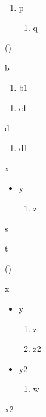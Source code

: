 \documentclass{article}
\begin{document}
\begin{enumerate}\item p \begin{enumerate}\item q\end{enumerate}\end{enumerate}
\begin{list}{()}{}
\item b \begin{enumerate}\item b1\end{enumerate}
 \begin{enumerate}\item c1\end{enumerate}
\item d \begin{enumerate}\item d1\end{enumerate}
\end{list}

\begin{list}{}{}\item x \begin{itemize}\item y \begin{enumerate}\item z\end{enumerate}\end{itemize}\end{list}

\begin{list}{}{}\item s \begin{steps2}\item t\end{steps2}\end{list}

\begin{list}{()}{}\item x \begin{itemize}\item y \begin{enumerate}\item z\item z2\end{enumerate}\item y2 \begin{enumerate}\item w\end{enumerate}\end{itemize}\item x2\end{list}
\end{document}
